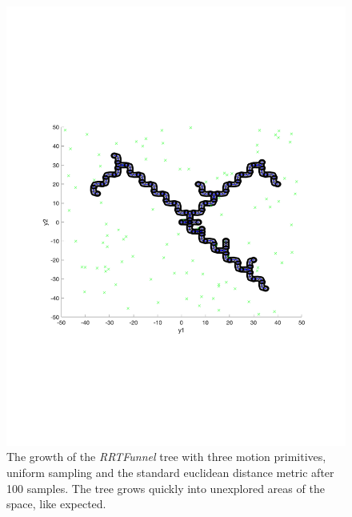 \begin{figure}
  \includegraphics[scale=.5]{figures/rrtfunnel/rrtfunnel-100samples}
  \caption{The growth of the \textit{RRTFunnel} tree with three motion
    primitives, uniform sampling and the standard euclidean distance metric
    after 100 samples. The tree grows quickly into unexplored areas of the
    space, like expected.}
\end{figure}


